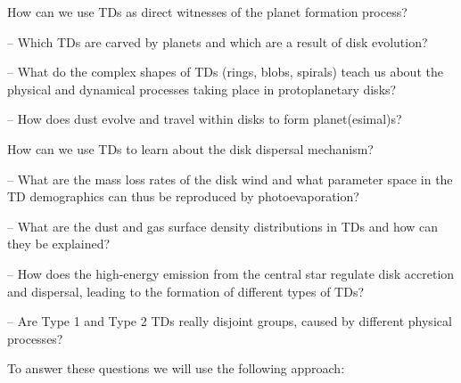 \documentclass[10pt,fleqn,twoside]{article}
\begin{document}
\begin{highlight}
How can we use TDs as direct witnesses of the planet formation process?
\end{highlight}
\begin{compactitemize}
\item[--] Which TDs are carved by planets and which are a result of disk evolution? 
\item[--] What do the complex shapes of TDs (rings, blobs, spirals) teach us about the physical and
dynamical processes taking place in protoplanetary disks?
\item[--] How does dust evolve and travel within disks to form planet(esimal)s?
\end{compactitemize}
\vspace{1em}
\begin{highlight}
How can we use TDs to learn about the disk dispersal mechanism?
\end{highlight}
\begin{compactitemize}
\item[--] What are the mass loss rates of the disk wind and
  what parameter space in the TD demographics can thus be reproduced
  by photoevaporation?
\item[--] What are the dust and gas surface density
  distributions in TDs and how can they be
  explained?
\item[--] How does the high-energy emission from the central
  star regulate disk accretion and dispersal, leading to the formation
  of different types of TDs?
\item[--] Are Type 1 and Type 2 TDs really disjoint groups, caused by 
  different physical processes?
\end{compactitemize} 
\vspace{1em}

To answer these questions we will use the following approach: 
\end{document}
